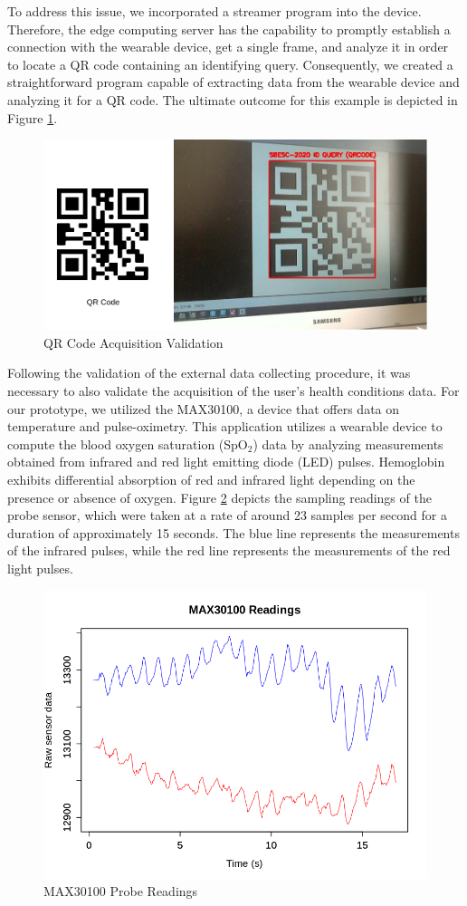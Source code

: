 To address this issue, we incorporated a streamer program into the device. Therefore, the edge computing server has the capability to promptly establish a connection with the wearable device, get a single frame, and analyze it in order to locate a QR code containing an identifying query. Consequently, we created a straightforward program capable of extracting data from the wearable device and analyzing it for a QR code. The ultimate outcome for this example is depicted in Figure \ref{fig:qr-code-validation}.

\begin{figure}[!h]
    \centering
    \includegraphics[width = .7\linewidth]{Figures/validation-1.png}
    \caption{QR Code Acquisition Validation}
    \label{fig:qr-code-validation}
\end{figure}

Following the validation of the external data collecting procedure, it was necessary to also validate the acquisition of the user's health conditions data. For our prototype, we utilized the MAX30100, a device that offers data on temperature and pulse-oximetry. This application utilizes a wearable device to compute the blood oxygen saturation (SpO$_2$) data by analyzing measurements obtained from infrared and red light emitting diode (LED) pulses. Hemoglobin exhibits differential absorption of red and infrared light depending on the presence or absence of oxygen. Figure \ref{fig:max30100-data} depicts the sampling readings of the probe sensor, which were taken at a rate of around 23 samples per second for a duration of approximately 15 seconds. The blue line represents the measurements of the infrared pulses, while the red line represents the measurements of the red light pulses.

\begin{figure}[h!]
    \centering
    \includegraphics[width = .6\linewidth]{Figures/max30100-data.png}
    \caption{MAX30100 Probe Readings}
    \label{fig:max30100-data}
\end{figure}

